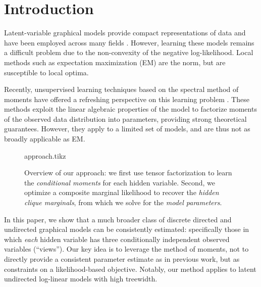 \section{Introduction}
\label{sec:introduction}

Latent-variable graphical models provide compact representations of data
and have been employed across many fields %
\cite{ghahramani1999variational,jaakkola1999variational,blei03lda,quattoni04crf,beaumont2004bayesian,haghighi06prototype}.
However, learning these models remains a difficult problem due to the
non-convexity of the negative log-likelihood.  Local methods such as expectation maximization (EM)
are the norm, but are susceptible to local optima.

Recently, unsupervised learning techniques based on the spectral method of moments
have offered a refreshing perspective on
this learning problem
\citep{mossel2005learning,
hsu09spectral,
bailly2010spectral,
song2011spectral,
anandkumar11tree,
anandkumar12lda,
anandkumar12moments,
hsu12identifiability,
balle12automata}.
These methods exploit the linear algebraic properties of the model to
factorize moments of the observed data distribution into parameters,
providing strong theoretical guarantees.
However, they apply to a limited set of models, and are thus
not as broadly applicable as EM.

\begin{figure}[t]
  \label{fig:approach}
  \centering
  {approach.tikz}
  \caption{
  Overview of our approach:
  we first use tensor factorization to learn the \emph{conditional moments}
  for each hidden variable.
  Second, we optimize a composite marginal likelihood to recover the \emph{hidden clique marginals},
  from which we solve for the \emph{model parameters}.
  }
\end{figure}


In this paper,
we show that a much broader class of discrete directed and undirected graphical
models can be consistently estimated:
specifically those in which \emph{each} hidden variable has three conditionally
independent observed variables (``views'').
Our key idea is to leverage the method of moments,
not to directly provide a consistent parameter estimate as in previous work,
but as constraints on a likelihood-based objective.
Notably, our method applies to latent undirected log-linear models with high treewidth.

